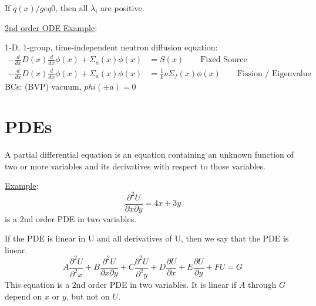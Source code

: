 \documentclass[12pt]{article}
\begin{document}
If $q(x) /geq 0$, then all $\lambda_i$ are positive.

\vspace*{1em}
\noindent \underline{2nd order ODE Example}:

1-D, 1-group, time-independent neutron diffusion equation:
%
\begin{align}
-\frac{d}{dx}D(x)\frac{d}{dx}\phi(x) + \Sigma_a(x)\phi(x) &= S(x) \qquad \text{Fixed Source} \nonumber \\
-\frac{d}{dx}D(x)\frac{d}{dx}\phi(x) + \Sigma_a(x)\phi(x) &= \frac{1}{k} \nu \Sigma_f(x) \phi(x)\qquad \text{Fission / Eigenvalue} \nonumber
\end{align}
%
BCs: (BVP) vacuum, $phi(\pm a) = 0$

\section{PDEs}

A partial differential equation is an equation containing an unknown function of two or more variables and its derivatives with respect to those variables. 

\vspace*{1em}
\noindent \underline{Example}:
%
\begin{equation}
\frac{\partial^2 U}{\partial x \partial  y} = 4x + 3y \nonumber
\end{equation}
%
is a 2nd order PDE in two variables. 

If the PDE is linear in U and all derivatives of U, then we say that the PDE is linear.
%
\begin{equation}
A\frac{\partial^2 U}{\partial^2 x} + B\frac{\partial^2 U}{\partial x \partial  y} + C\frac{\partial^2 U}{\partial^2 y} + D\frac{\partial U}{\partial x} + E\frac{\partial U}{\partial y} + FU = G \nonumber
\end{equation}
%
This equation is a 2nd order PDE in two variables. It is linear if $A$ through $G$ depend on $x$ or $y$, but not on $U$.
\end{document}
